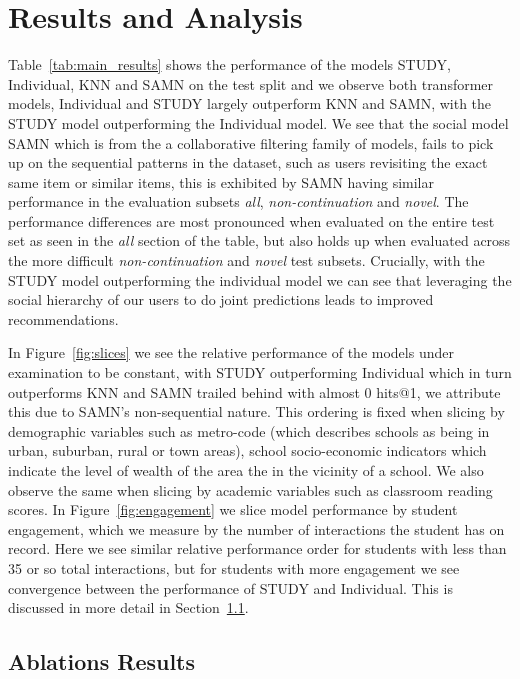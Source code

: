 \documentclass{article}
\begin{document}
\section{Results and Analysis}
\label{section:results}
Table~\ref{tab:main_results} shows the performance of the models STUDY, Individual, KNN and SAMN on the test split and we observe both transformer models, Individual and STUDY largely outperform KNN and SAMN, with the STUDY model outperforming the Individual model. We see that the social model SAMN which is from the a collaborative filtering family of models, fails to pick up on the sequential patterns in the dataset, such as users revisiting the exact same item or similar items, this is exhibited by SAMN having similar performance in the evaluation subsets {\it all}, {\it non-continuation} and {\it novel}. The performance differences are most pronounced when evaluated on the entire test set as seen in the \textit{all} section of the table, but also holds up when evaluated across the more difficult \textit{non-continuation} and \textit{novel} test subsets. Crucially, with the STUDY model outperforming the individual model we can see that leveraging the social hierarchy of our users to do joint predictions leads to improved recommendations.

In Figure~\ref{fig:slices} we see the relative performance of the models under examination to be constant, with STUDY outperforming Individual which in turn outperforms KNN and SAMN trailed behind with almost 0 hits@1, we attribute this due to SAMN's non-sequential nature. This ordering is fixed when slicing by demographic variables such as metro-code (which describes schools as being in urban, suburban, rural or town areas), school socio-economic indicators which indicate the level of wealth of the area the in the vicinity of a school. We also observe the same when slicing by academic variables such as classroom reading scores. In Figure~\ref{fig:engagement} we slice model performance by student engagement, which we measure by the number of interactions the student has on record. Here we see similar relative performance order for students with less than 35 or so total interactions, but for students with more engagement we see convergence between the performance of STUDY and Individual. This is discussed in more detail in Section~\ref{section:ablation_results}.

\subsection{Ablations Results}
\label{section:ablation_results}
\end{document}
